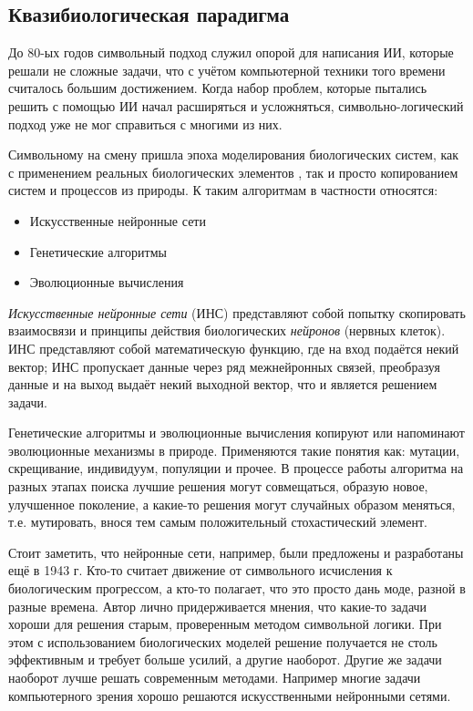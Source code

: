 \documentclass[12pt]{report}
\newenvironment{myItemize}{
	\begin{itemize}
  		\setlength{\itemsep}{1pt}
  		\setlength{\parskip}{0pt}
  		\setlength{\parsep}{0pt}
}{\end{itemize}}
\begin{document}
\subsection{Квазибиологическая парадигма}
До 80-ых годов символьный подход служил опорой для написания ИИ, которые решали не сложные задачи, что с учётом компьютерной техники того времени считалось большим достижением. Когда набор проблем, которые пытались решить с помощью ИИ начал расширяться и усложняться, символьно-логический подход уже не мог справиться с многими из них.

Символьному на смену пришла эпоха моделирования биологических систем, как с применением реальных биологических элементов \citep{rambidi2002}, так и просто копированием систем и процессов из природы. К таким алгоритмам в частности относятся:

\begin{samepage}

\begin{myItemize}
\item Искусственные нейронные сети
\item Генетические алгоритмы
\item Эволюционные вычисления
\end{myItemize}
\end{samepage}
\emph{Искусственные нейронные сети} (ИНС) представляют собой попытку скопировать взаимосвязи и принципы действия биологических \emph{нейронов} (нервных клеток). ИНС представляют собой математическую функцию, где на вход подаётся некий вектор; ИНС пропускает данные через ряд межнейронных связей, преобразуя данные и на выход выдаёт некий выходной вектор, что и является решением задачи.\cite{haykin1994neural}

Генетические алгоритмы и эволюционные вычисления копируют или напоминают эволюционные механизмы в природе. Применяются такие понятия как: мутации, скрещивание, индивидуум, популяции и прочее. В процессе работы алгоритма на разных этапах поиска лучшие решения могут совмещаться, образую новое, улучшенное поколение, а какие-то решения могут случайных образом меняться, т.е. мутировать, внося тем самым положительный стохастический элемент.\citep{russell1995}

Стоит заметить, что нейронные сети, например, были предложены и разработаны ещё в 1943 г. \citep{mcculloch1943} Кто-то считает движение от символьного исчисления к биологическим прогрессом, а кто-то полагает, что это просто дань моде, разной в разные времена. \citep{millington2009} Автор лично придерживается мнения, что какие-то задачи хороши для решения старым, проверенным методом символьной логики. При этом с использованием биологических моделей решение получается не столь эффективным и требует больше усилий, а другие наоборот. Другие же задачи наоборот лучше решать современным методами. Например многие задачи компьютерного зрения хорошо решаются искусственными нейронными сетями. \citep{haykin1994neural}
\end{document}
